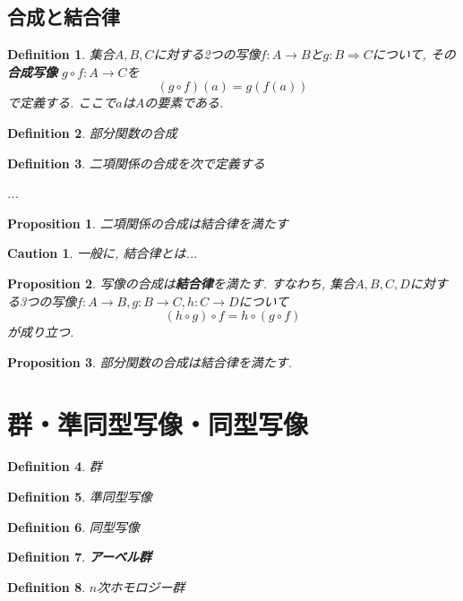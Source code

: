 \documentclass{jsbook}
\theoremstyle{plain}
\newtheorem{Def}{Definition}[chapter]
\newtheorem{Prop}{Proposition}[chapter]
\newtheorem{caution}{Caution}[chapter]
\begin{document}
\subsection{合成と結合律}
\begin{Def}
集合$A,B,C$に対する2つの写像$f:A\rightarrow B$と$g:B\Rightarrow C$について, その{\bf 合成写像} $g\circ f:A\rightarrow C$を
\[
(g\circ f)(a)=g(f(a))
\]
で定義する. ここで$a$は$A$の要素である.
\end{Def}
\begin{Def}
部分関数の合成
\end{Def}
\begin{Def}
二項関係の合成を次で定義する

...
\end{Def}
\begin{Prop}
二項関係の合成は結合律を満たす
\end{Prop}
\begin{caution}
一般に, 結合律とは...
\end{caution}
\begin{Prop}
写像の合成は{\bf 結合律}を満たす.
すなわち, 集合$A,B,C,D$に対する3つの写像$f:A\rightarrow B, g:B\rightarrow C,
h:C\rightarrow D$について
\[
(h\circ g)\circ f=h\circ(g\circ f)
\]
が成り立つ.
\end{Prop}
\begin{Prop}
部分関数の合成は結合律を満たす.
\end{Prop}
\section{群・準同型写像・同型写像}
\begin{Def}
群
\end{Def}
\begin{Def}
準同型写像
\end{Def}
\begin{Def}
同型写像
\end{Def}
\begin{Def}
{\bf アーベル群}
\end{Def}
\begin{Def}
$n$次ホモロジー群
\end{Def}
\end{document}
